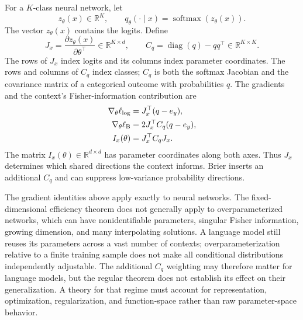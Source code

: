 \documentclass[11pt,twoside]{article}
\newcommand{\R}{\mathbb R}
\theoremstyle{definition}
\theoremstyle{remark}
\begin{document}
For a $K$-class neural network, let
\begin{equation}
z_\theta(x)\in\R^K,
\qquad
q_\theta(\cdot\mid x)=\operatorname{softmax}(z_\theta(x)).
\label{eq:logits-softmax}
\end{equation}
The vector $z_\theta(x)$ contains the logits. Define
\begin{equation}
J_x=\frac{\partial z_\theta(x)}{\partial\theta^\top}
\in\R^{K\times d},
\qquad
C_q=\operatorname{diag}(q)-qq^\top\in\R^{K\times K}.
\label{eq:jacobian-categorical-covariance}
\end{equation}
The rows of $J_x$ index logits and its columns index parameter coordinates.
The rows and columns of $C_q$ index classes; $C_q$ is both the softmax Jacobian
and the covariance matrix of a categorical outcome with probabilities $q$.
The gradients and the context's Fisher-information contribution are
\begin{equation}
\begin{aligned}
\nabla_\theta\ell_{\log}
&=J_x^\top(q-e_y),\\
\nabla_\theta\ell_{\rm B}
&=2J_x^\top C_q(q-e_y),\\
I_x(\theta)&=J_x^\top C_qJ_x.
\end{aligned}
\label{eq:neural-gradients}
\end{equation}
The matrix $I_x(\theta)\in\R^{d\times d}$ has parameter coordinates along both
axes.
Thus $J_x$ determines which shared directions the context informs. Brier
inserts an additional $C_q$ and can suppress low-variance probability
directions.

The gradient identities above apply exactly to neural networks. The
fixed-dimensional efficiency theorem does not generally apply to
overparameterized networks, which can have nonidentifiable parameters,
singular Fisher information, growing dimension, and many interpolating
solutions. A language model still reuses its parameters across a vast number
of contexts; overparameterization relative to a finite training sample does
not make all conditional distributions independently adjustable.
The additional $C_q$ weighting may therefore matter for language models, but the
regular theorem does not establish its effect on their generalization. A
theory for that regime must account for representation, optimization,
regularization, and function-space rather than raw parameter-space behavior.
\end{document}
